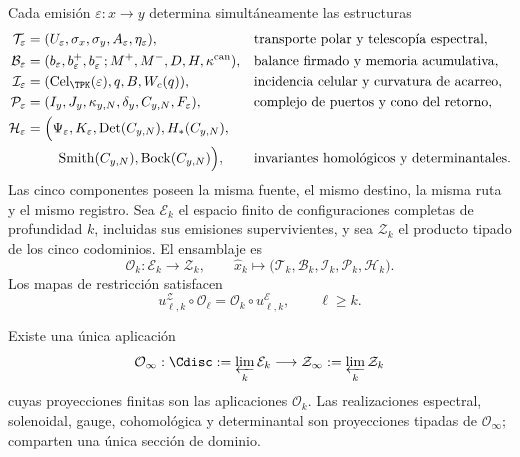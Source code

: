 Cada emisión \(\varepsilon:x\to y\) determina simultáneamente las estructuras
\begin{align}
 \mathcal T_\varepsilon
 &=(U_\varepsilon,\sigma_x,\sigma_y,
 A_\varepsilon,\eta_\varepsilon),
 &&\text{transporte polar y telescopía espectral},
 \label{eq:componente-transporte-polar}\\
 \mathcal B_\varepsilon
 &=(b_\varepsilon,b_\varepsilon^+,b_\varepsilon^-;
 M^+,M^-,D,H,\kappa^{\rm can}),
 &&\text{balance firmado y memoria acumulativa},
 \label{eq:componente-balance-firmado}\\
 \mathcal I_\varepsilon
 &=(\operatorname{Cel}_{\TPK}(\varepsilon),q,B,W_c(q)),
 &&\text{incidencia celular y curvatura de acarreo},
 \label{eq:componente-incidencia-celular}\\
 \mathcal P_\varepsilon
 &=(I_y,J_y,\kappa_{y,N},\delta_y,C_{y,N},F_\varepsilon),
 &&\text{complejo de puertos y cono del retorno},
 \label{eq:componente-complejo-puertos}\\
 \mathcal H_\varepsilon
 &=\Bigl(\Psi_\varepsilon,K_\varepsilon,
 \operatorname{Det}(C_{y,N}),H_*(C_{y,N}),\notag\\
 &\hspace{2.2em}\operatorname{Smith}(C_{y,N}),
 \operatorname{Bock}(C_{y,N})\Bigr),
 &&\text{invariantes homológicos y determinantales}.
 \label{eq:componente-homologico-determinantal}
\end{align}
Las cinco componentes poseen la misma fuente, el mismo destino, la misma
ruta y el mismo registro. Sea \(\mathcal E_k\) el espacio finito de
configuraciones completas de profundidad \(k\), incluidas sus emisiones
supervivientes, y sea \(\mathcal Z_k\) el producto tipado de los cinco
codominios. El ensamblaje es
\begin{equation}
 \mathcal O_k:\mathcal E_k\longrightarrow\mathcal Z_k,
 \qquad
 \widehat x_k\longmapsto
 \bigl(\mathcal T_k,\mathcal B_k,\mathcal I_k,
       \mathcal P_k,\mathcal H_k\bigr).
 \label{eq:ensamblaje-cinco-construcciones}
\end{equation}
Los mapas de restricción satisfacen
\begin{equation}
 u^{\mathcal Z}_{\ell,k}\circ\mathcal O_\ell
 =\mathcal O_k\circ u^{\mathcal E}_{\ell,k},
 \qquad \ell\geq k.
 \label{eq:naturalidad-cinco-construcciones}
\end{equation}

\begin{theorem}
\label{thm:cinco-construcciones-inseparables}
Existe una única aplicación
\begin{equation}
 \mathcal O_\infty:
 \Cdisc:=\varprojlim_k\mathcal E_k
 \longrightarrow
 \mathcal Z_\infty:=\varprojlim_k\mathcal Z_k
 \label{eq:operador-conjunto-continuo}
\end{equation}
cuyas proyecciones finitas son las aplicaciones
\(\mathcal O_k\). Las realizaciones espectral, solenoidal, gauge,
cohomológica y determinantal son proyecciones tipadas de
\(\mathcal O_\infty\); comparten una única sección de dominio.
\end{theorem}

